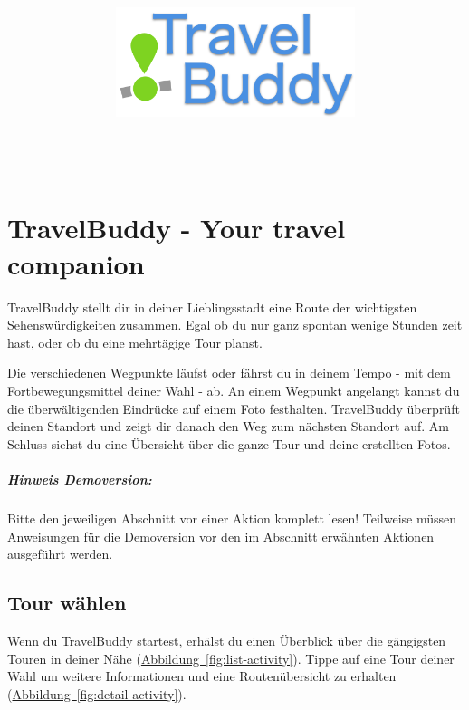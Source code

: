 \documentclass[a4paper,10pt,xetex]{article}
\title{
  \includegraphics[width=7cm]{travel-buddy_white}\\[\bigskipamount]
  \documenttitle\\[\bigskipamount]
}
\author{\documentauthors}
\date{\parbox{\linewidth}{\centering%
  IT15TA ZH \hspace*{3cm} Gruppe 3\endgraf\bigskip
  Dokumentversion \documentversion, \documentdate\endgraf
}}
\begin{document}

\maketitle\newpage

%

\section{TravelBuddy - Your travel companion}

TravelBuddy stellt dir in deiner Lieblingsstadt eine Route der wichtigsten Sehenswürdigkeiten
zusammen. Egal ob du nur ganz spontan wenige Stunden zeit hast, oder ob du eine mehrtägige
Tour planst.

Die verschiedenen Wegpunkte läufst oder fährst du in deinem Tempo - mit dem Fortbewegungsmittel
deiner Wahl - ab. An einem Wegpunkt angelangt kannst du die überwältigenden Eindrücke auf
einem Foto festhalten. TravelBuddy überprüft deinen Standort und zeigt dir danach den Weg
zum nächsten Standort auf. Am Schluss siehst du eine Übersicht über die ganze Tour und
deine erstellten Fotos.

\subparagraph{Hinweis Demoversion:}
Bitte den jeweiligen Abschnitt vor einer Aktion komplett lesen! Teilweise müssen
Anweisungen für die Demoversion vor den im Abschnitt erwähnten Aktionen ausgeführt werden.

\subsection{Tour wählen}
Wenn du TravelBuddy startest, erhälst du einen Überblick über die gängigsten Touren in
deiner Nähe (\hyperref[fig:list-activity]{Abbildung~\ref*{fig:list-activity}}).
Tippe auf eine Tour deiner Wahl um weitere Informationen und eine
Routenübersicht zu erhalten (\hyperref[fig:detail-activity]{Abbildung~\ref*{fig:detail-activity}}).
\end{document}
